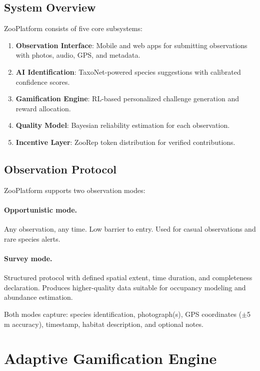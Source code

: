 \documentclass[11pt,a4paper]{article}
\begin{document}
\subsection{System Overview}

ZooPlatform consists of five core subsystems:

\begin{enumerate}
  \item \textbf{Observation Interface}: Mobile and web apps for
    submitting observations with photos, audio, GPS, and metadata.
  \item \textbf{AI Identification}: TaxoNet-powered species suggestions
    with calibrated confidence scores.
  \item \textbf{Gamification Engine}: RL-based personalized challenge
    generation and reward allocation.
  \item \textbf{Quality Model}: Bayesian reliability estimation for
    each observation.
  \item \textbf{Incentive Layer}: ZooRep token distribution for
    verified contributions.
\end{enumerate}

\subsection{Observation Protocol}

ZooPlatform supports two observation modes:

\paragraph{Opportunistic mode.} Any observation, any time. Low barrier
to entry. Used for casual observations and rare species alerts.

\paragraph{Survey mode.} Structured protocol with defined spatial extent,
time duration, and completeness declaration. Produces higher-quality data
suitable for occupancy modeling and abundance estimation.

Both modes capture: species identification, photograph(s), GPS
coordinates ($\pm$5\,m accuracy), timestamp, habitat description, and
optional notes.


\section{Adaptive Gamification Engine}
\label{sec:gamification}
\end{document}
